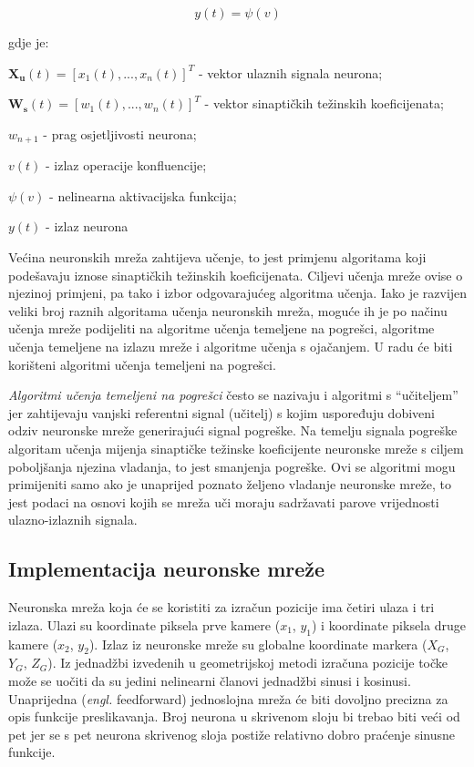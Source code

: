\documentclass[times, utf8, diplomski]{fer}
\begin{document}
\begin{equation}
y(t) = \psi(v)
\end{equation}

gdje je:

$\bm{X_u}(t) = [x_1(t),...,x_n(t)]^T$ - vektor ulaznih signala neurona;

$\bm{W_s}(t) = [w_1(t),...,w_n(t)]^T$ - vektor sinaptičkih težinskih koeficijenata;

$w_{n+1}$ - prag osjetljivosti neurona;

$v(t)$ - izlaz operacije konfluencije;

$\psi(v)$ - nelinearna aktivacijska funkcija;

$y(t)$ - izlaz neurona

\vspace{5mm}

Većina neuronskih mreža zahtijeva učenje, to jest primjenu algoritama koji podešavaju iznose sinaptičkih težinskih koeficijenata. Ciljevi učenja mreže ovise o njezinoj primjeni, pa tako i izbor odgovarajućeg algoritma učenja. Iako je razvijen veliki broj raznih
algoritama učenja neuronskih mreža, moguće ih je po načinu učenja mreže podijeliti na algoritme učenja temeljene na pogrešci, algoritme učenja temeljene na izlazu mreže i algoritme učenja s ojačanjem. U radu će biti korišteni algoritmi učenja temeljeni na pogrešci.

\textit{Algoritmi učenja temeljeni na pogrešci} često se nazivaju i algoritmi s “učiteljem” jer zahtijevaju vanjski referentni signal (učitelj) s kojim uspoređuju dobiveni odziv neuronske mreže generirajući signal pogreške. Na temelju signala pogreške algoritam učenja mijenja sinaptičke težinske koeficijente neuronske mreže s ciljem poboljšanja njezina vladanja, to jest smanjenja pogreške. Ovi se algoritmi mogu primijeniti samo ako je unaprijed poznato željeno vladanje neuronske mreže, to jest podaci na osnovi kojih se mreža uči moraju sadržavati parove vrijednosti ulazno-izlaznih signala.\citep{ISU}

\subsection{Implementacija neuronske mreže}
Neuronska mreža koja će se koristiti za izračun pozicije ima četiri ulaza i tri izlaza. Ulazi su koordinate piksela prve kamere ($x_1$, $y_1$) i koordinate piksela druge kamere ($x_2$, $y_2$). Izlaz iz neuronske mreže su globalne koordinate markera ($X_G$, $Y_G$, $Z_G$). Iz jednadžbi izvedenih u geometrijskoj metodi izračuna pozicije točke može se uočiti da su jedini nelinearni članovi jednadžbi sinusi i kosinusi. Unaprijedna (\textit{engl.} feedforward) jednoslojna mreža će biti dovoljno precizna za opis funkcije preslikavanja. Broj neurona u skrivenom sloju bi trebao biti veći od pet jer se s pet neurona skrivenog sloja postiže relativno dobro praćenje sinusne funkcije.
\end{document}
